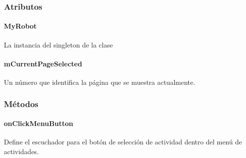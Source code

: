 \subsubsection{Atributos}
\label{\detokenize{dev_docs:id5}}

\paragraph{MyRobot}
\label{\detokenize{dev_docs:id6}}

\begin{fulllineitems}
\label{\detokenize{dev_docs:com.lar.cloudnao.MenuActivity.MyRobot}}
La instancia del singleton de la clase {\hyperref[\detokenize{dev_docs:com.lar.cloudnao.Robot}]{}}

\end{fulllineitems}



\paragraph{mCurrentPageSelected}
\label{\detokenize{dev_docs:mcurrentpageselected}}

\begin{fulllineitems}
\label{\detokenize{dev_docs:com.lar.cloudnao.MenuActivity.mCurrentPageSelected}}
Un número que identifica la página que se muestra actualmente.

\end{fulllineitems}



\subsubsection{Métodos}
\label{\detokenize{dev_docs:id7}}

\paragraph{onClickMenuButton}
\label{\detokenize{dev_docs:onclickmenubutton}}

\begin{fulllineitems}
\label{\detokenize{dev_docs:com.lar.cloudnao.MenuActivity.onClickMenuButton()}}
Define el escuchador para el botón de selección de actividad dentro del menú de actividades.

\end{fulllineitems}



